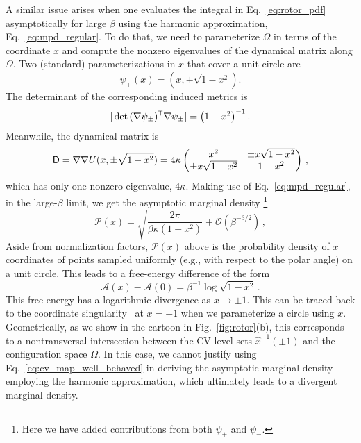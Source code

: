 \begin{subappendices}
A similar issue arises when one evaluates the integral in Eq.~\eqref{eq:rotor_pdf} asymptotically for large $\beta$ using the harmonic approximation, Eq.~\eqref{eq:mpd_regular}.
To do that, we need to parameterize $\Omega$ in terms of the coordinate $x$ and compute the nonzero eigenvalues of the dynamical matrix along $\Omega$.
Two (standard) parameterizations in $x$ that cover a unit circle are
%
\begin{equation}
  \psi_{\pm}(x) = \left(x, \pm\sqrt{1 - x^2}\right).
\end{equation}
%
The determinant of the corresponding induced metrics is
%
\begin{equation}
  |\det\, (\nabla\psi_{\pm})^\mathsf{T} \nabla\psi_{\pm}| = \left(1-x^2\right)^{-1}.
\end{equation}
%
Meanwhile, the dynamical matrix is
%
\begin{equation}
  \mathsf{D} = \nabla\nabla U(x, \pm\sqrt{1-x^2}) = 4\kappa
  \begin{pmatrix}
    x^2 & \pm x\sqrt{1-x^2}\\
    \pm x\sqrt{1-x^2} & 1-x^2
  \end{pmatrix}\,,
\end{equation}
%
which has only one nonzero eigenvalue, $4\kappa$.
Making use of Eq.~\eqref{eq:mpd_regular}, in the large-$\beta$ limit, we get the asymptotic marginal density%
\footnote{Here we have added contributions from both $\psi_{+}$ and $\psi_{-}$.}
%
\begin{equation}
  \mathscr{P}(x) = \sqrt{\frac{2\pi}{\beta\kappa(1-x^2)}} + \mathcal{O}(\beta^{-3/2})\,,
\end{equation}
%
Aside from normalization factors, $\mathscr{P}(x)$ above is the probability density of $x$ coordinates of points sampled uniformly (e.g., with respect to the polar angle) on a unit circle.
This leads to a free-energy difference of the form
%
\begin{equation}\label{eq:rotor_asy_a}
  \mathscr{A}(x) - \mathscr{A}(0) = \beta^{-1}\log\sqrt{1-x^2}\,.
\end{equation}
%
This free energy has a logarithmic divergence as $x \to \pm 1$.
This can be traced back to the coordinate singularity~\cite{liu2003} at $x = \pm 1$ when we parameterize a circle using $x$.
Geometrically, as we show in the cartoon in Fig.~\ref{fig:rotor}(b), this corresponds to a nontransversal intersection between the CV level sets $\hat{x}^{-1}(\pm 1)$ and the configuration space $\Omega$.
In this case, we cannot justify using Eq.~\eqref{eq:cv_map_well_behaved} in deriving the asymptotic marginal density employing the harmonic approximation, which ultimately leads to a divergent marginal density.

\end{subappendices}
